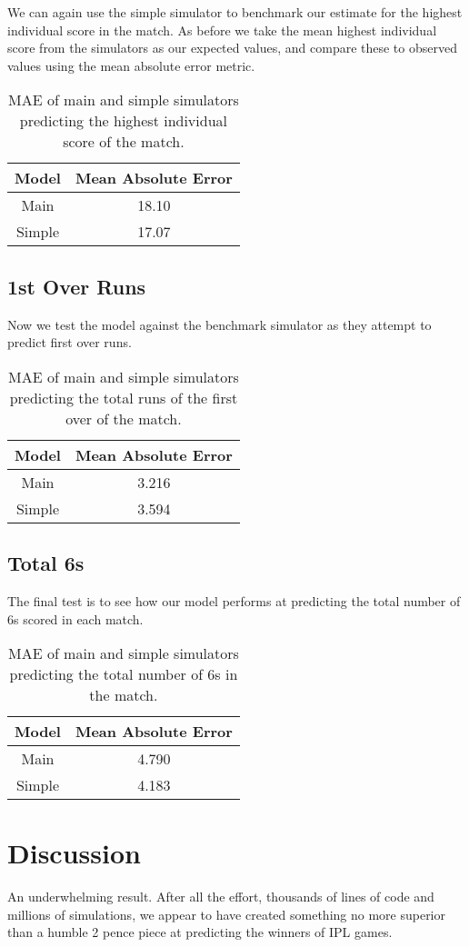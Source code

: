 We can again use the simple simulator to benchmark our estimate for the highest individual score in the match. As before we take the mean highest individual score from the simulators as our expected values, and compare these to observed values using the mean absolute error metric.

\begin{table}[ht]
\vspace{0.5em}
\centering
\begin{tabular} {c c} \toprule
    {Model} & {Mean Absolute Error} \\ \midrule
     Main & 18.10 \\
     Simple & 17.07 \\ \bottomrule
\end{tabular}
\caption{MAE of main and simple simulators predicting the highest individual score of the match.}
\label{table: his}
\end{table}

\subsection{1st Over Runs}

Now we test the model against the benchmark simulator as they attempt to predict first over runs.

\begin{table}[ht]
\vspace{0.5em}
\centering
\begin{tabular} {c c} \toprule
    {Model} & {Mean Absolute Error} \\ \midrule
     Main & 3.216 \\
     Simple & 3.594 \\ \bottomrule
\end{tabular}
\caption{MAE of main and simple simulators predicting the total runs of the first over of the match.}
\label{table: fos}
\end{table}

\subsection{Total 6s}

The final test is to see how our model performs at predicting the total number of 6s scored in each match.

\begin{table}[ht]
\vspace{0.5em}
\centering
\begin{tabular} {c c} \toprule
    {Model} & {Mean Absolute Error} \\ \midrule
     Main & 4.790 \\
     Simple & 4.183 \\ \bottomrule
\end{tabular}
\caption{MAE of main and simple simulators predicting the total number of 6s in the match.}
\label{table: six}
\end{table}

\section{Discussion}

An underwhelming result. After all the effort, thousands of lines of code and millions of simulations, we appear to have created something no more superior than a humble 2 pence piece at predicting the winners of IPL games.
